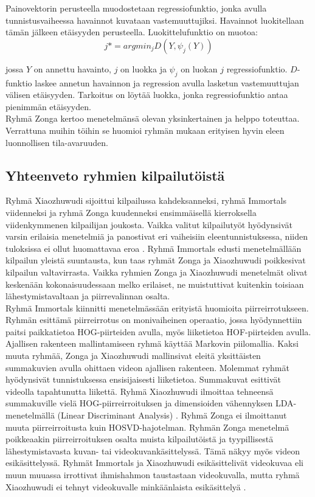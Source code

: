 Painovektorin perusteella muodostetaan regressiofunktio, jonka avulla tunnistusvaiheessa havainnot kuvataan vastemuuttujiksi. 
Havainnot luokitellaan tämän jälkeen etäisyyden perusteella. Luokittelufunktio on muotoa:
\begin{equation}
j*=argmin_{j}D(Y,\psi_{j}(Y))
\end{equation}

jossa $Y$ on annettu havainto, $j$ on luokka ja $\psi_{j}$ on luokan $j$ regressiofunktio. $D$-funktio laskee annetun havainnon
ja regression avulla lasketun vastemuuttujan välisen etäisyyden. Tarkoitus on löytää luokka, jonka regressiofunktio antaa pienimmän etäisyyden.
\citep {6239180}\\ 

Ryhmä Zonga kertoo menetelmänsä olevan yksinkertainen ja helppo toteuttaa. 
Verrattuna muihin töihin se huomioi ryhmän mukaan erityisen hyvin eleen luonnollisen tila-avaruuden. \citep{firstround} 

\subsection{Yhteenveto ryhmien kilpailutöistä}

Ryhmä Xiaozhuwudi sijoittui kilpailussa kahdeksanneksi, ryhmä Immortals viidenneksi ja ryhmä Zonga kuudenneksi ensimmäisellä kierroksella
viidenkymmenen kilpailijan joukosta. Vaikka valitut kilpailutyöt hyödynsivät varsin erilaisia menetelmiä ja panostivat eri vaiheisiin eleentunnistuksessa,
niiden tuloksissa ei ollut huomattavaa eroa \citep{6239178}. Ryhmä Immortals edusti menetelmällään kilpailun yleistä suuntausta,
kun taas ryhmät Zonga ja Xiaozhuwudi poikkesivat kilpailun valtavirrasta. Vaikka ryhmien Zonga ja Xiaozhuwudi menetelmät olivat keskenään
kokonaisuudessaan melko erilaiset, ne muistuttivat kuitenkin toisiaan lähestymistavaltaan ja piirrevalinnan osalta.\\

Ryhmä Immortals kiinnitti menetelmässään erityistä huomioita piirreirrotukseen. Ryhmän esittämä piirreirrotus on monivaiheinen operaatio,
jossa hyödynnettiin paitsi paikkatietoa HOG-piirteiden avulla, myös liiketietoa HOF-piirteiden avulla.
Ajallisen rakenteen mallintamiseen ryhmä käyttää Markovin piilomallia. Kaksi muuta ryhmää,
Zonga ja Xiaozhuwudi mallinsivat eleitä yksittäisten summakuvien avulla ohittaen videon ajallisen rakenteen.
Molemmat ryhmät hyödynsivät tunnistuksessa ensisijaisesti liiketietoa. Summakuvat esittivät videolla tapahtunutta liikettä.
Ryhmä Xiaozhuwudi ilmoittaa tehneensä summakuville vielä HOG-piirreirroituksen ja dimensioiden vähennyksen LDA-menetelmällä (Linear Discriminant Analysis) \citep{6239179}.
Ryhmä Zonga ei ilmoittanut muuta piirreirroitusta kuin HOSVD-hajotelman. Ryhmän Zonga menetelmä poikkeaakin piirreirroituksen osalta
muista kilpailutöistä ja tyypillisestä lähestymistavasta kuvan- tai videokuvankäsittelyssä. Tämä näkyy myös videon esikäsittelyssä. 
Ryhmät Immortals ja Xiaozhuwudi esikäsittelivät videokuvaa eli muun muuassa irrottivat ihmishahmon taustastaan videokuvalla,
mutta ryhmä Xiaozhuwudi ei tehnyt videokuvalle minkäänlaista esikäsittelyä \citep{firstround}.\\

